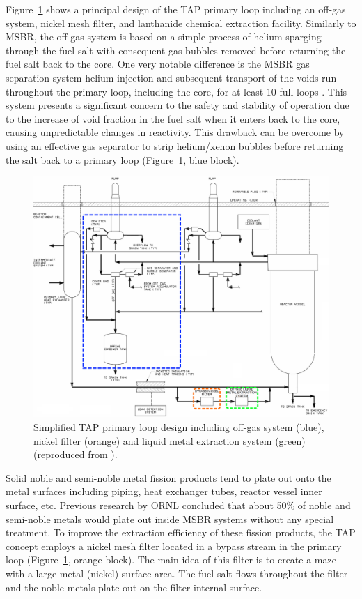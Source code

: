 \documentclass[12pt]{article} %
\begin{document}
Figure~\ref{fig:tap-reproc} shows a principal design of the \gls{TAP} primary 
loop including an off-gas system, nickel mesh filter, and lanthanide chemical 
extraction facility. Similarly to \gls{MSBR}, the off-gas system is based on a 
simple process of helium sparging through the fuel salt with consequent gas 
bubbles removed before returning the fuel salt back to the core. One very 
notable difference is the \gls{MSBR} gas separation system helium injection 
and subsequent transport of the voids run throughout the primary loop, 
including the core, for at least 10 full loops 
\cite{robertson_conceptual_1971}. This system presents a significant concern 
to the safety and stability of operation due to the increase of void fraction 
in the fuel salt when it enters back to the core, causing unpredictable 
changes in reactivity. This drawback can be overcome by using an effective gas 
separator to strip helium/xenon bubbles before returning the salt back to a 
primary loop (Figure~\ref{fig:tap-reproc}, blue block). 
\begin{figure}[htp!] %
  \centering
		  \includegraphics[width=\textwidth]{tap_primary_loop.png}
  \caption{Simplified \gls{TAP} primary loop design including off-gas system 
  (blue), nickel filter (orange) and liquid metal extraction system (green) 
  (reproduced from \cite{transatomic_power_transatomic_2019}).}
  \label{fig:tap-reproc}
\end{figure}

Solid noble and semi-noble metal fission products tend to plate out onto the  
metal surfaces including piping, heat exchanger tubes, reactor vessel inner 
surface, etc. Previous research by \gls{ORNL} \cite{robertson_conceptual_1971} 
concluded that about 50\% of noble and semi-noble metals would plate out 
inside \gls{MSBR} systems without any special treatment. To improve the 
extraction efficiency of these fission products, the \gls{TAP} concept employs 
a nickel mesh filter located in a bypass stream in the primary loop 
(Figure~\ref{fig:tap-reproc}, orange block). The main idea of this filter is 
to create a maze with a large metal (nickel) surface area. The fuel salt flows 
throughout the filter and the noble metals plate-out on the filter internal 
surface. 
\end{document}
